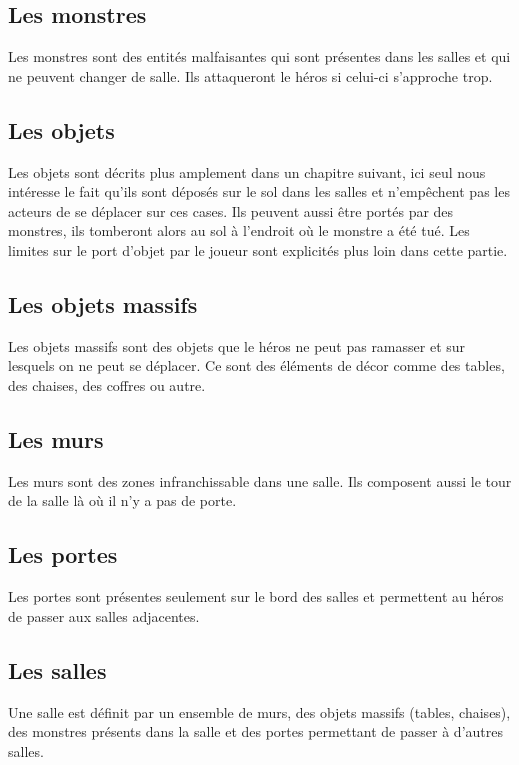 \documentclass[a4paper, 11pt]{report}
\begin{document}
        \subsection{Les monstres}
          Les monstres sont des entités malfaisantes qui sont présentes dans les salles et qui ne peuvent
          changer de salle. Ils attaqueront le héros si celui-ci s'approche trop.

        \subsection{Les objets}
          Les objets sont décrits plus amplement dans un chapitre suivant, ici seul nous intéresse le fait qu'ils
          sont déposés sur le sol dans les salles et n'emp\^echent pas les acteurs de se déplacer sur ces 
          cases. Ils peuvent aussi \^etre portés par des monstres, ils tomberont alors au sol à l'endroit où le
          monstre a été tué. Les limites sur le port d'objet par le joueur sont explicités plus loin dans cette 
          partie.
          
        \subsection{Les objets massifs}
          Les objets massifs sont des objets que le héros ne peut pas ramasser et sur lesquels on ne peut se
          déplacer. Ce sont des éléments de décor comme des tables, des chaises, des coffres ou autre.
          
        \subsection{Les murs}
          Les murs sont des zones infranchissable dans une salle. Ils composent aussi le tour de la salle là où
          il n'y a pas de porte.
          
        \subsection{Les portes}
          Les portes sont présentes seulement sur le bord des salles et permettent au héros de passer aux 
          salles adjacentes.
          
        \subsection{Les salles}
          Une salle est définit par un ensemble de murs, des objets massifs (tables, chaises), des monstres
          présents dans la salle et des portes permettant de passer à d'autres salles.
          
\end{document}
